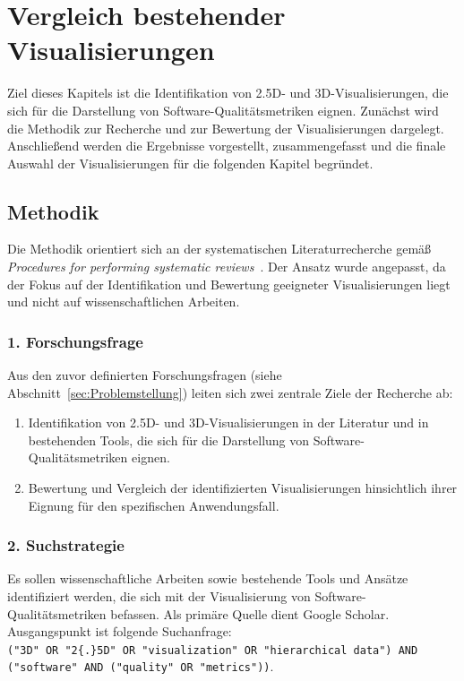 \chapter{Vergleich bestehender Visualisierungen} \label{sec:LiteraturRecherche}

Ziel dieses Kapitels ist die Identifikation von 2{.}5D- und 3D-Visualisierungen, die sich für die Darstellung von Software-Qualitätsmetriken eignen. Zunächst wird die Methodik zur Recherche und zur Bewertung der Visualisierungen dargelegt. Anschließend werden die Ergebnisse vorgestellt, zusammengefasst und die finale Auswahl der Visualisierungen für die folgenden Kapitel begründet.

\section{Methodik} \label{sec:Methodik}
Die Methodik orientiert sich an der systematischen Literaturrecherche gemäß \textit{Procedures for performing systematic reviews}~\cite{kitchenham2004procedures}. Der Ansatz wurde angepasst, da der Fokus auf der Identifikation und Bewertung geeigneter Visualisierungen liegt und nicht auf wissenschaftlichen Arbeiten.

\subsection*{1. Forschungsfrage} \label{sec:Forschungsfrage}
Aus den zuvor definierten Forschungsfragen (siehe Abschnitt~\ref{sec:Problemstellung}) leiten sich zwei zentrale Ziele der Recherche ab:
\begin{enumerate}
    \item Identifikation von 2{.}5D- und 3D-Visualisierungen in der Literatur und in bestehenden Tools, die sich für die Darstellung von Software-Qualitätsmetriken eignen.
    \item Bewertung und Vergleich der identifizierten Visualisierungen hinsichtlich ihrer Eignung für den spezifischen Anwendungsfall.
\end{enumerate}

\subsection*{2. Suchstrategie} \label{sec:Suchstrategie}
Es sollen wissenschaftliche Arbeiten sowie bestehende Tools und Ansätze identifiziert werden, die sich mit der Visualisierung von Software-Qualitätsmetriken befassen.
Als primäre Quelle dient Google Scholar. Ausgangspunkt ist folgende Suchanfrage:\\
\verb|("3D" OR "2{.}5D" OR "visualization" OR "hierarchical data") AND|\\
\verb|("software" AND ("quality" OR "metrics"))|.\\

